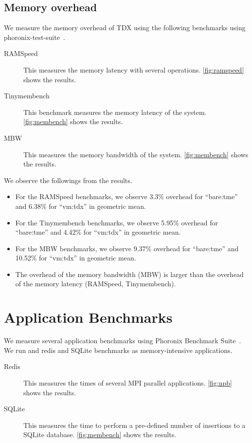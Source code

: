 \documentclass[letterpaper,twocolumn,10pt]{article}
\begin{document}
\subsection{Memory overhead}
We measure the memory overhead of TDX using the following benchmarks using phoronix-test-suite~\cite{phoronix}.

\begin{description}

\item[RAMSpeed~\cite{ramspeed}] This measures the memory latency with several operations. \autoref{fig:ramspeed} shows the results.
\item[Tinymembench~\cite{tinymembench}] This benchmark measures the memory latency of the system. \autoref{fig:membench} shows the results.
\item[MBW~\cite{mbw}] This measures the memory bandwidth of the system. \autoref{fig:membench} shows the results.
\end{description}


We observe the followings from the results.
\begin{itemize}
    \item For the RAMSpeed benchmarks, we observe 3.3\% overhead for ``bare:tme'' and 6.38\% for ``vm:tdx'' in geometric mean.
    \item For the Tinymembench benchmarks, we observe 5.95\% overhead for ``bare:tme'' and 4.42\% for ``vm:tdx'' in geometric mean.
    \item For the MBW benchmarks, we observe 9.37\% overhead for ``bare:tme'' and 10.52\% for ``vm:tdx'' in geometric mean.
    \item The overhead of the memory bandwidth (MBW) is larger than the overhead of the memory latency (RAMSpeed, Tinymembench).
\end{itemize}

\section{Application Benchmarks}
\label{sec:app:benchmark}

We measure several application benchmarks using Phoronix Benchmark Suite~\cite{phoronix}.
We run and redis and SQLite benchmarks as memory-intensive applications.

\begin{description}
\item[Redis~\cite{sqlite_bench}] This measures the times of several MPI parallel applications. \autoref{fig:npb} shows the results.
\item[SQLite~\cite{sqlite_bench}] This measures the time to perform a pre-defined number of insertions to a SQLite database. \autoref{fig:membench} shows the results.
\end{description}
\end{document}
